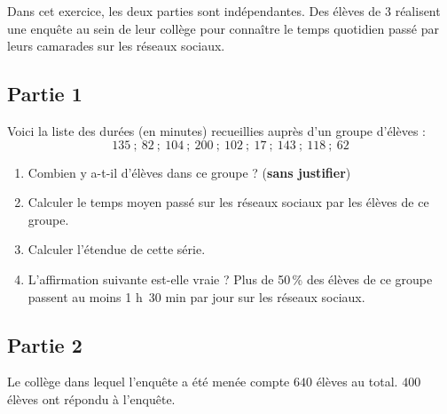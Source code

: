 \documentclass[exercice,a4]{thedocument}%
\begin{document}
%
\providecommand{\degres}{^\circ}%
    

Dans cet exercice, les deux parties sont indépendantes. Des élèves de 3 réalisent une enquête au sein de leur collège pour connaître le temps quotidien passé par leurs camarades sur les réseaux sociaux.

\subsection*{Partie 1}
Voici la liste des durées (en minutes) recueillies auprès d'un groupe d'élèves :
\[135~;~82~;~104~;~200~;~102~;~17~;~143~;~118~;~62\]

\begin{enumerate}
\item Combien y a-t-il d'élèves dans ce groupe ? (\textbf{sans justifier})
\item Calculer le temps moyen passé sur les réseaux sociaux par les élèves de ce groupe.
\item Calculer l'étendue de cette série.
\item L'affirmation suivante est-elle vraie ? \og Plus de 50\,\% des élèves de ce groupe passent au moins 1 h~30 min par jour sur les réseaux sociaux. \fg
\end{enumerate}

\subsection*{Partie 2}

Le collège dans lequel l'enquête a été menée compte $640$ élèves au total. $400$ élèves ont répondu à l'enquête.
\end{document}
